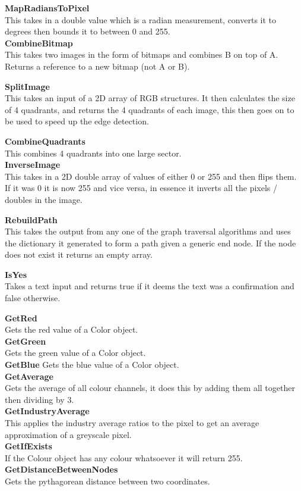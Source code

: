 \begin{FlushLeft}
    \textbf{MapRadiansToPixel} \\ \bk
    This takes in a double value which is a radian measurement, converts it to degrees then bounds it to between 0 and 255.\\\bk
    \textbf{CombineBitmap} \\ \bk
    This takes two images in the form of bitmaps and combines B on top of A. Returns a reference to a new bitmap (not A or B).\\\bk

    \textbf{SplitImage} \\ \bk
    This takes an input of a 2D array of RGB structures. It then calculates the size of 4 quadrants, and returns the 4 quadrants of each image, this then goes on to be used to speed up the edge detection.\\\bk
    
    \textbf{CombineQuadrants} \\ \bk
    This combines 4 quadrants into one large sector.\\\bk
    \textbf{InverseImage} \\ \bk
    This takes in a 2D double array of values of either 0 or 255 and then flips them. If it was 0 it is now 255 and vice versa, in essence it inverts all the pixels / doubles in the image.\\\bk

    \textbf{RebuildPath} \\ \bk
    This takes the output from any one of the graph traversal algorithms and uses the dictionary it generated to form a path given a generic end node. If the node does not exist it returns an empty array.\\\bk
    
    \textbf{IsYes} \\ \bk
    Takes a text input and returns true if it deems the text was a confirmation and false otherwise.\\\bk

    \textbf{GetRed} \\ \bk
    Gets the red value of a Color object.\\\bk
    \textbf{GetGreen} \\ \bk
    Gets the green value of a Color object.\\\bk
    \textbf{GetBlue}
    Gets the blue value of a Color object.\\\bk
    \textbf{GetAverage} \\ \bk
    Gets the average of all colour channels, it does this by adding them all together then dividing by 3.\\\bk
    \textbf{GetIndustryAverage} \\ \bk
    This applies the industry average ratios to the pixel to get an average approximation of a greyscale pixel.\\\bk
    \textbf{GetIfExists} \\ \bk
    If the Colour object has any colour whatsoever it will return 255.\\\bk
    \textbf{GetDistanceBetweenNodes} \\ \bk
    Gets the pythagorean distance between two coordinates.\\


\end{FlushLeft}
